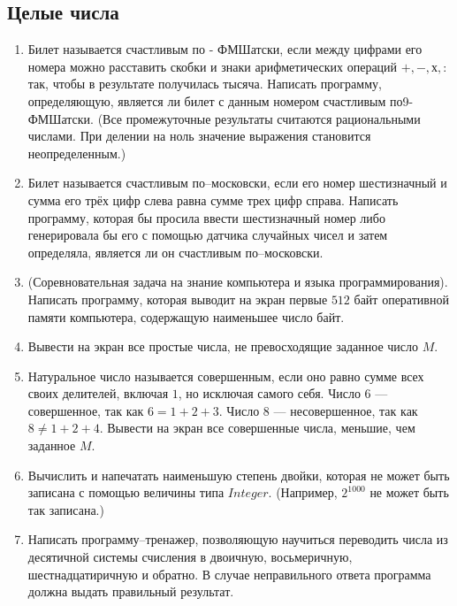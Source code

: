 \subsection{Целые числа}

\begin{enumerate}

  \item Билет называется счастливым по - ФМШатски, если между цифрами его номера можно расставить скобки и знаки арифметических операций $+, -, х , :$ так, чтобы в результате получилась тысяча. Написать программу, определяющую, является ли билет с данным номером счастливым по9-ФМШатски. (Все промежуточные результаты считаются рациональными числами. При делении на ноль значение выражения становится неопределенным.)

  \item Билет называется счастливым по--московски, если его номер шестизначный и сумма его трёх цифр слева равна сумме трех цифр справа. Написать программу, которая бы просила ввести шестизначный номер либо генерировала бы его с помощью датчика случайных чисел и затем определяла, является ли он счастливым по--московски.

  \item (Соревновательная задача на знание компьютера и языка программирования). Написать программу, которая выводит на экран первые $512$ байт оперативной памяти компьютера, содержащую наименьшее число байт.

  \item Вывести на экран все простые числа, не превосходящие заданное число $M$.

  \item Натуральное число называется совершенным, если оно равно сумме всех своих делителей, включая $1$, но исключая самого себя. Число $6$ --- совершенное, так как $6 = 1 + 2 + 3$. Число $8$ --- несовершенное, так как $8\neq 1 + 2 + 4$. Вывести на экран все совершенные числа, меньшие, чем заданное $M$.

  \item Вычислить и напечатать наименьшую степень двойки, которая не может быть записана с помощью величины типа $Integer$. (Например, $2^{1000}$ не может быть так записана.)

  \item Написать программу--тренажер, позволяющую научиться переводить числа из десятичной системы счисления в двоичную, восьмеричную, шестнадцатиричную и обратно. 
В случае неправильного ответа программа должна выдать правильный результат.

\end{enumerate}

